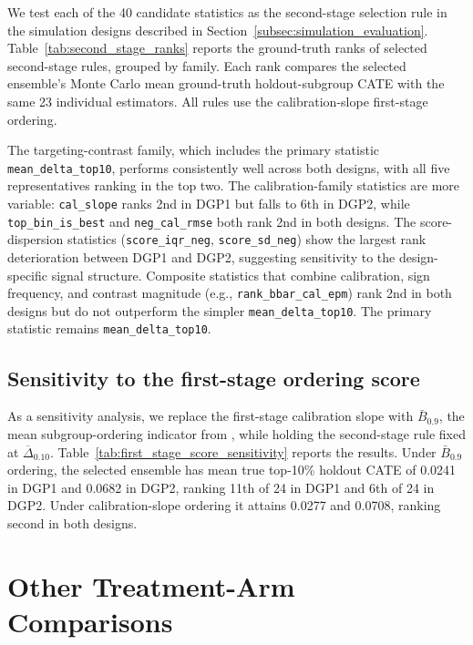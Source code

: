 \documentclass[12pt]{article}
\newcommand{\TargetFrac}{10{\%}\xspace}
\newcommand{\MeanDeltaTopTen}{\ensuremath{\overline{\Delta}_{0.10}}}
\begin{document}
We test each of the 40 candidate statistics as the second-stage selection rule in the simulation designs described in Section~\ref{subsec:simulation_evaluation}. Table~\ref{tab:second_stage_ranks} reports the ground-truth ranks of selected second-stage rules, grouped by family. Each rank compares the selected ensemble's Monte Carlo mean ground-truth holdout-subgroup CATE with the same 23 individual estimators. All rules use the calibration-slope first-stage ordering.



The targeting-contrast family, which includes the primary statistic \texttt{mean\_delta\_top10}, performs consistently well across both designs, with all five representatives ranking in the top two. The calibration-family statistics are more variable: \texttt{cal\_slope} ranks 2nd in DGP1 but falls to 6th in DGP2, while \texttt{top\_bin\_is\_best} and \texttt{neg\_cal\_rmse} both rank 2nd in both designs. The score-dispersion statistics (\texttt{score\_iqr\_neg}, \texttt{score\_sd\_neg}) show the largest rank deterioration between DGP1 and DGP2, suggesting sensitivity to the design-specific signal structure. Composite statistics that combine calibration, sign frequency, and contrast magnitude (e.g., \texttt{rank\_bbar\_cal\_epm}) rank 2nd in both designs but do not outperform the simpler \texttt{mean\_delta\_top10}. The primary statistic remains \texttt{mean\_delta\_top10}.

\subsection{Sensitivity to the first-stage ordering score}
\label{supp:first_stage_sensitivity}

As a sensitivity analysis, we replace the first-stage calibration slope with $\bar B_{0.9}$, the mean subgroup-ordering indicator from \citet{dwivedi2020}, while holding the second-stage rule fixed at $\MeanDeltaTopTen$. Table~\ref{tab:first_stage_score_sensitivity} reports the results. Under $\bar B_{0.9}$ ordering, the selected ensemble has mean true top-\TargetFrac holdout CATE of 0.0241 in DGP1 and 0.0682 in DGP2, ranking 11th of 24 in DGP1 and 6th of 24 in DGP2. Under calibration-slope ordering it attains 0.0277 and 0.0708, ranking second in both designs.



\section{Other Treatment-Arm Comparisons}
\label{supp:other_treatment_arms}
\end{document}

